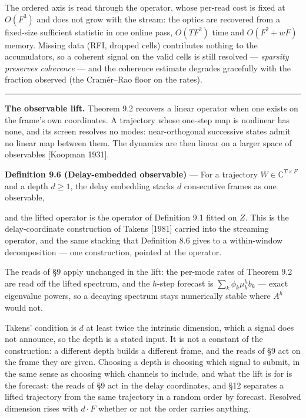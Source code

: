 \documentclass[10pt,letterpaper,twocolumn]{article}
\begin{document}
The ordered axis is read through the operator, whose per-read cost is fixed at \(O(F^3)\) and does not grow with the stream: the optics are recovered from a fixed-size sufficient statistic in one online pass, \(O(TF^2)\) time and \(O(F^2+wF)\) memory. Missing data (RFI, dropped cells) contributes nothing to the accumulators, so a coherent signal on the valid cells is still resolved --- \emph{sparsity preserves coherence} --- and the coherence estimate degrades gracefully with the fraction observed (the Cramér--Rao floor on the rates).

\begin{center}\rule{0.5\linewidth}{0.5pt}\end{center}

\textbf{The observable lift.} Theorem 9.2 recovers a linear operator when one exists on the frame's own coordinates. A trajectory whose one-step map is nonlinear has none, and its screen resolves no modes: near-orthogonal successive states admit no linear map between them. The dynamics are then linear on a larger space of observables {[}Koopman 1931{]}.

\textbf{Definition 9.6 (Delay-embedded observable)} --- For a trajectory \(W\in\mathbb{C}^{T\times F}\) and a depth \(d\ge 1\), the delay embedding stacks \(d\) consecutive frames as one observable,


and the lifted operator is the operator of Definition 9.1 fitted on \(Z\). This is the delay-coordinate construction of Takens {[}1981{]} carried into the streaming operator, and the same stacking that Definition 8.6 gives to a within-window decomposition --- one construction, pointed at the operator.

The reads of §9 apply unchanged in the lift: the per-mode rates of Theorem 9.2 are read off the lifted spectrum, and the \(h\)-step forecast is \(\sum_k \phi_k\mu_k^{h}b_k\) --- exact eigenvalue powers, so a decaying spectrum stays numerically stable where \(A^{h}\) would not.

Takens' condition is \(d\) at least twice the intrinsic dimension, which a signal does not announce, so the depth is a stated input. It is not a constant of the construction: a different depth builds a different frame, and the reads of §9 act on the frame they are given. Choosing a depth is choosing which signal to submit, in the same sense as choosing which channels to include, and what the lift is for is the forecast: the reads of §9 act in the delay coordinates, and §12 separates a lifted trajectory from the same trajectory in a random order by forecast. Resolved dimension rises with \(d\cdot F\) whether or not the order carries anything.
\end{document}
